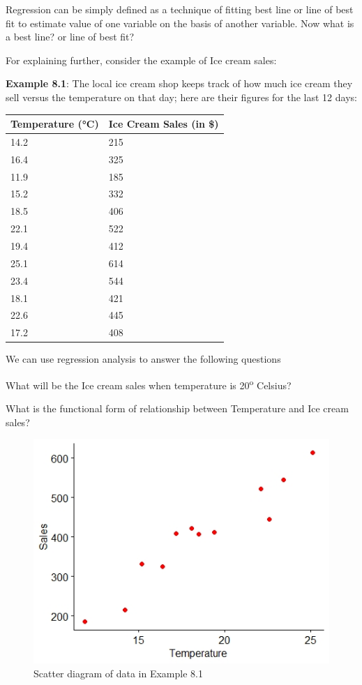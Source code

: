 \documentclass[
]{book}
\begin{document}
Regression can be simply defined as a technique of fitting best line or
line of best fit to estimate value of one variable on the basis of
another variable. Now what is a best line? or line of best fit?

For explaining further, consider the example of Ice cream sales:

\textbf{Example 8.1}: The local ice cream shop keeps track of how much ice
cream they sell versus the temperature on that day; here are their
figures for the last 12 days:

\begin{longtable}[]{@{}ll@{}}
\toprule
Temperature (°C) & Ice Cream Sales (in \$) \\
\midrule
\endhead
14.2 & 215 \\
16.4 & 325 \\
11.9 & 185 \\
15.2 & 332 \\
18.5 & 406 \\
22.1 & 522 \\
19.4 & 412 \\
25.1 & 614 \\
23.4 & 544 \\
18.1 & 421 \\
22.6 & 445 \\
17.2 & 408 \\
\bottomrule
\end{longtable}

We can use regression analysis to answer the following questions

What will be the Ice cream sales when temperature is 20\textsuperscript{o} Celsius?

What is the functional form of relationship between Temperature and Ice
cream sales?

\begin{figure}

{\centering \includegraphics[width=0.5\linewidth]{images/r2} 

}

\caption{Scatter diagram of data in Example 8.1}\label{fig:r1}
\end{figure}
\end{document}
